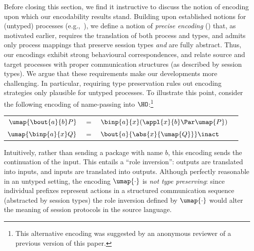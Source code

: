 Before closing this section, we find it instructive to discuss the notion of encoding 
upon which our 
encodability results stand.
Building upon established notions for (untyped) processes (e.g.,~\cite{DBLP:journals/iandc/Gorla10}), 
we define a notion of \emph{precise encoding} () that, as motivated earlier,  
requires the translation of both process and types, and 
admits only process mappings that preserve session types
\emph{and} are fully abstract. Thus, our encodings 
exhibit   strong behavioural correspondences, and 
 relate source and target processes with  
proper communication structures (as described by session types).
We argue that these requirements make our developments more challenging.
In particular, requiring type preservation rules out encoding strategies only plausible for untyped processes.
To illustrate this point,
consider the  following encoding of %
name-passing 
into $\HO$:\footnote{This alternative  encoding was suggested by an anonymous reviewer of a previous version of this paper.} %
\begin{center}
\begin{tabular}{rcll}
  $\umap{\bout{a}{b} P}$	&$=$&	$\binp{a}{x}( \appl{x}{b} \Par \umap{P})$ \\
  $\umap{\binp{a}{x} Q}$	&$=$&	$\bout{a}{\abs{x}{\umap{Q}}} \inact$
\end{tabular}
\end{center}
Intuitively, 
rather than sending a package with name $b$, 
this encoding sends the continuation of the input. This entails  a 
``role inversion'': outputs are translated into inputs, and inputs are translated into outputs. 
Although perfectly reasonable in an  {untyped setting}, the encoding $\umap{\cdot}$  
is \emph{not type preserving}: 
since 
individual  prefixes represent actions in a structured communication sequence (abstracted by session types)
the role inversion defined by $\umap{\cdot}$ would alter the meaning of session protocols in the source language.




